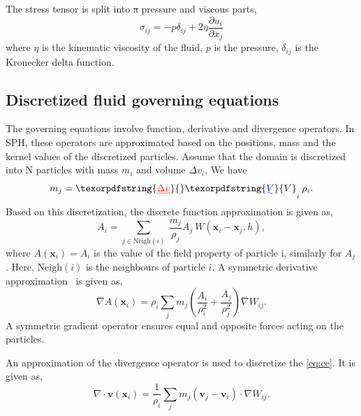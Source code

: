 \documentclass[preprint,12pt]{elsarticle}
\newcommand{\ten}[1]{\ensuremath{\mathbf{#1}}}
\providecommand{\DIFaddtex}[1]{{\protect\color{blue}\uwave{#1}}} %
\providecommand{\DIFdeltex}[1]{{\protect\color{red}\sout{#1}}}                      %
\providecommand{\DIFaddbegin}{} %
\providecommand{\DIFaddend}{} %
\providecommand{\DIFdelbegin}{} %
\providecommand{\DIFdelend}{} %
\providecommand{\DIFadd}[1]{\texorpdfstring{\DIFaddtex{#1}}{#1}} %
\providecommand{\DIFdel}[1]{\texorpdfstring{\DIFdeltex{#1}}{}} %
\newcommand{\DIFscaledelfig}{0.5}
\newlength{\DIFdelgraphicswidth} %
\newlength{\DIFdelgraphicsheight} %
\newcommand{\DIFaddincludegraphics}[2][]{{\color{blue}\fbox{\DIFOincludegraphics[#1]{#2}}}} %
\newcommand{\DIFdelincludegraphics}[2][]{%
\sbox{\DIFdelgraphicsbox}{\DIFOincludegraphics[#1]{#2}}%
\settoboxwidth{\DIFdelgraphicswidth}{\DIFdelgraphicsbox} %
\settoboxtotalheight{\DIFdelgraphicsheight}{\DIFdelgraphicsbox} %
\scalebox{\DIFscaledelfig}{%
\parbox[b]{\DIFdelgraphicswidth}{\usebox{\DIFdelgraphicsbox}\\[-\baselineskip] \rule{\DIFdelgraphicswidth}{0em}}\llap{\resizebox{\DIFdelgraphicswidth}{\DIFdelgraphicsheight}{%
\setlength{\unitlength}{\DIFdelgraphicswidth}%
\begin{picture}(1,1)%
\thicklines\linethickness{2pt} %
{\color[rgb]{1,0,0}\put(0,0){\framebox(1,1){}}}%
{\color[rgb]{1,0,0}\put(0,0){\line( 1,1){1}}}%
{\color[rgb]{1,0,0}\put(0,1){\line(1,-1){1}}}%
\end{picture}%
}\hspace*{3pt}}} %
} %
\DeclareRobustCommand{\DIFaddbegin}{\DIFOaddbegin \let\includegraphics\DIFaddincludegraphics} %
\DeclareRobustCommand{\DIFaddend}{\DIFOaddend \let\includegraphics\DIFOincludegraphics} %
\DeclareRobustCommand{\DIFdelbegin}{\DIFOdelbegin \let\includegraphics\DIFdelincludegraphics} %
\DeclareRobustCommand{\DIFdelend}{\DIFOaddend \let\includegraphics\DIFOincludegraphics} %
\begin{document}
The stress tensor is split into \DIFdelbegin \DIFdel{a }\DIFdelend pressure and viscous parts,
\begin{equation}
  \label{eq:fluid-stress-decomposition}
  \sigma_{ij} = - p \delta_{ij} + 2 \eta \frac{\partial u_i}{\partial x_j}
\end{equation}
where $\eta$ is the kinematic viscosity of the fluid, $p$ is the pressure,
$\delta_{ij}$ is the Kronecker delta function.


\FloatBarrier%
\subsection{Discretized fluid governing equations}
\label{sec:sph--governing-equations}
The governing equations involve function, derivative and divergence
operators. In SPH, these operators are approximated based on the positions,
mass and the kernel values of the discretized particles. Assume that the
domain is discretized into N particles with mass $m_i$ and volume
\DIFdelbegin \DIFdel{$\Delta v_i$}\DIFdelend \DIFaddbegin \DIFadd{$V_i$}\DIFaddend , We have
\begin{equation}
  \label{eq:mass_repr}
  m_j = \DIFdelbegin \DIFdel{\Delta v}\DIFdelend \DIFaddbegin \DIFadd{V}\DIFaddend _i \> \rho_i.
\end{equation}
Based on this discretization, the discrete function approximation is given as,
\begin{equation}
  \label{eq:discrete_form}
  A_i = \sum_{j \in \text{Neigh}(i)}\> \frac{m_j}{\rho_j} A_j\> W(\ten{x}_i - \ten{x}_j, h),
\end{equation}
where $A(\boldsymbol{x}_i) = A_i$ is the value of the field property of
particle i, similarly for $A_j$. Here, $\text{Neigh}(i)$ is the neighbours of
particle $i$.  A symmetric derivative approximation~\cite{Violeau16} is given
as,
\begin{equation}
  \nabla A(\ten{x}_i) = \rho_i \sum_{j} m_j \left(\frac{A_i}{\rho_i^2} + \frac{A_j}{\rho_j^2}\right) \nabla W_{ij}.
\end{equation}
A symmetric gradient operator ensures equal and opposite forces acting on the
particles.


An approximation of the divergence operator is used to discretize the
\cref{eq:ce}.  It is given as,
\begin{equation}
  \label{intro:eq:sph-continu-div-final}
  \nabla \cdot \ten{v}(\ten{x}_i) = \frac{1}{\rho_i} \sum_{j} m_j \left(\ten{v}_j - \ten{v}_i\right) \cdot \nabla W_{ij}.
\end{equation}
\end{document}
